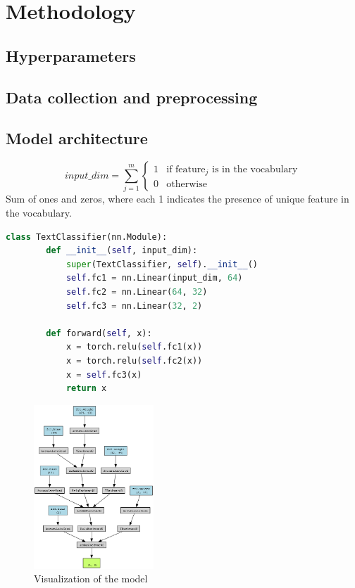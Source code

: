 ﻿\section{Methodology}

\lstset{
  basicstyle=\small\ttfamily,
  captionpos=b,
  frame=single,
  breaklines=true,
  showstringspaces=false,
  aboveskip=2.5pt,
  belowskip=2pt
}

\subsection{Hyperparameters}

\subsection{Data collection and preprocessing}

\subsection{Model architecture}
\[
    input\_dim = \sum_{j=1}^{m} \begin{cases} 1 & \text{if feature}_j \text{ is in the vocabulary} \\ 0 & \text{otherwise} \end{cases}
\]
\indent Sum of ones and zeros, where each 1 indicates the presence of unique feature in the vocabulary.

\begin{lstlisting}[language=Python, caption={Modell Python kód tartalma}, label=modell]
    class TextClassifier(nn.Module):
        def __init__(self, input_dim):
            super(TextClassifier, self).__init__()
            self.fc1 = nn.Linear(input_dim, 64)
            self.fc2 = nn.Linear(64, 32)
            self.fc3 = nn.Linear(32, 2)

        def forward(self, x):
            x = torch.relu(self.fc1(x))
            x = torch.relu(self.fc2(x))
            x = self.fc3(x)
            return x
\end{lstlisting}
\begin{figure}[H]
    \centering
    \caption{Visualization of the model}
    \includegraphics[width=0.4\textwidth]{text_classifier_model.png}
\end{figure}

